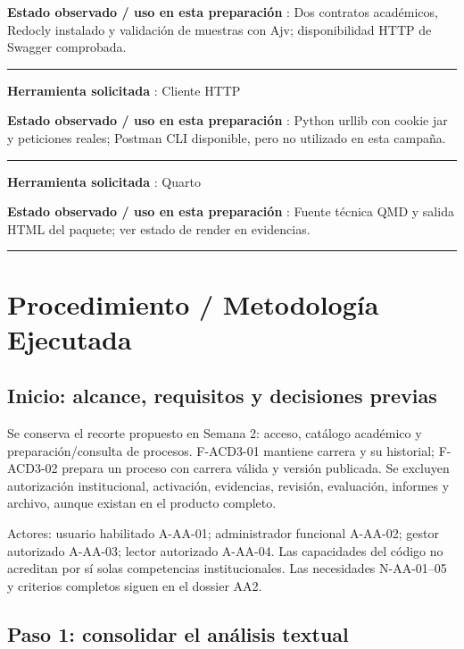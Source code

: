 \documentclass[11pt,a4paper]{article}
\begin{document}
\textbf{Estado observado / uso en esta preparación }: Dos contratos
académicos, Redocly instalado y validación de muestras con Ajv;
disponibilidad HTTP de Swagger comprobada.

\medskip\hrule\medskip

\textbf{Herramienta solicitada }: Cliente HTTP

\textbf{Estado observado / uso en esta preparación }: Python urllib con
cookie jar y peticiones reales; Postman CLI disponible, pero no
utilizado en esta campaña.

\medskip\hrule\medskip

\textbf{Herramienta solicitada }: Quarto

\textbf{Estado observado / uso en esta preparación }: Fuente técnica QMD
y salida HTML del paquete; ver estado de render en evidencias.


\medskip\hrule\medskip

\section{Procedimiento / Metodología
Ejecutada}\label{informe-procedimiento--metodologuxeda-ejecutada}

\subsection{Inicio: alcance, requisitos y decisiones
previas}\label{informe-inicio-alcance-requisitos-y-decisiones-previas}

Se conserva el recorte propuesto en Semana 2: acceso, catálogo académico
y preparación/consulta de procesos. F-ACD3-01 mantiene carrera y su
historial; F-ACD3-02 prepara un proceso con carrera válida y versión
publicada. Se excluyen autorización institucional, activación,
evidencias, revisión, evaluación, informes y archivo, aunque existan en
el producto completo.

Actores: usuario habilitado A-AA-01; administrador funcional A-AA-02;
gestor autorizado A-AA-03; lector autorizado A-AA-04. Las capacidades
del código no acreditan por sí solas competencias institucionales. Las
necesidades N-AA-01--05 y criterios completos siguen en el dossier AA2.

\subsection{Paso 1: consolidar el análisis
textual}\label{informe-paso-1-consolidar-el-anuxe1lisis-textual}
\end{document}
